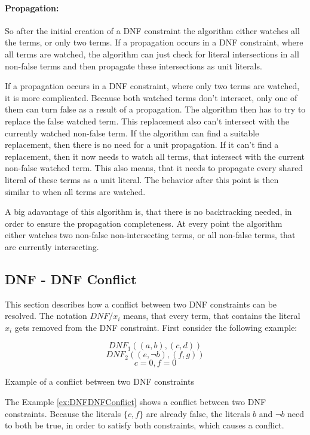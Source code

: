 \paragraph{Propagation:}
So after the initial creation of a DNF constraint the algorithm either watches all the terms, or only two terms. If a propagation occurs in a DNF constraint, where all terms are watched, the algorithm can just check for literal intersections in all non-false terms and then propagate these intersections as unit literals.

If a propagation occurs in a DNF constraint, where only two terms are watched, it is more complicated. Because both watched terms don't intersect, only one of them can turn false as a result of a propagation. The algorithm then has to try to replace the false watched term. This replacement also can't intersect with the currently watched non-false term. If the algorithm can find a suitable replacement, then there is no need for a unit propagation. If it can't find a replacement, then it now needs to watch all terms, that intersect with the current non-false watched term. This also means, that it needs to propagate every shared literal of these terms as a unit literal. The behavior after this point is then similar to when all terms are watched.

A big adavantage of this algorithm is, that there is no backtracking needed, in order to ensure the propagation completeness. At every point the algorithm either watches two non-false non-intersecting terms, or all non-false terms, that are currently intersecting.


\newpage
\subsection{DNF - DNF Conflict}

This section describes how a conflict between two DNF constraints can be resolved. The notation $DNF/x_i$ means, that every term, that contains the literal $x_i$ gets removed from the DNF constraint. First consider the following example:

\begin{example}[!htb]
\begin{leftbar}
\begin{displaymath}
DNF_1 ((a,b),(c,d))
\end{displaymath}
\begin{displaymath}
DNF_2 ((e,\neg b),(f,g))
\end{displaymath}
\begin{displaymath}
c = 0, f = 0
\end{displaymath}
\end{leftbar}
\caption{Example of a conflict between two DNF constraints}
\label{ex:DNFDNFConflict}
\end{example}
The Example \ref{ex:DNFDNFConflict} shows a conflict between two DNF constraints. Because the literals $\{c,f\}$ are already false, the literals $b$ and $\neg b$ need to both be true, in order to satisfy both constraints, which causes a conflict.

